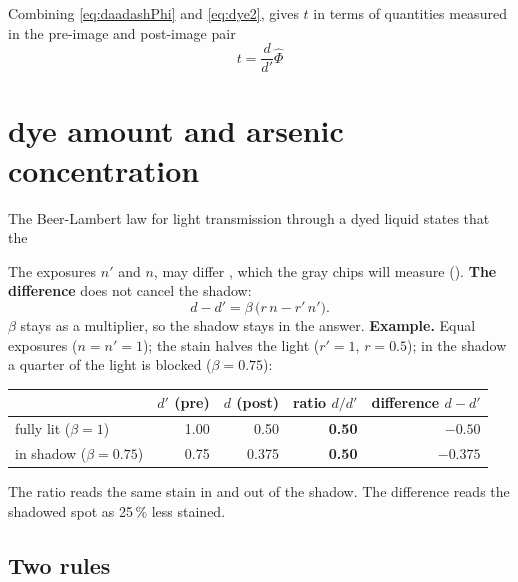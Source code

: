 \documentclass[11pt,letter]{article}
\begin{document}
Combining \eqref{eq:daadashPhi} and \eqref{eq:dye2}, gives $t$ in terms of quantities measured in the pre-image and post-image pair
\begin{equation}
	t   = \frac{d}{d'} \widehat\Phi
	\label{eq:dye3}
\end{equation}


\section{dye amount and arsenic concentration}

The Beer-Lambert law for light transmission through a dyed liquid states that the 

The exposures $n'$ and $n$,  may differ
, which the gray chips
will measure ().
%
\noindent\textbf{The difference} does not cancel the shadow:
\begin{equation}
  d - d' = \beta\,\bigl(r\, n - r'\, n'\bigr).
  \label{eq:te-diff}
\end{equation}
$\beta$ stays as a multiplier, so the shadow stays in the answer.
%
\noindent\textbf{Example.}  Equal exposures ($n = n' = 1$); the stain
halves the light ($r' = 1$, $r = 0.5$); in the shadow a quarter of the
light is blocked ($\beta = 0.75$):
%
\medskip
\begin{center}
\begin{tabular}{@{}lrrrr@{}}
\toprule
 & $d'$ (pre) & $d$ (post) & ratio $d/d'$ & difference $d - d'$ \\
\midrule
fully lit ($\beta = 1$)    & 1.00 & 0.50  & \textbf{0.50} & $-0.50$ \\
in shadow ($\beta = 0.75$) & 0.75 & 0.375 & \textbf{0.50} & $-0.375$ \\
\bottomrule
\end{tabular}
\end{center}
%
\noindent The ratio reads the same stain in and out of the shadow.  The
difference reads the shadowed spot as 25\,\% less stained.
%
\subsection{Two rules}
\label{sec:rules}
\end{document}
